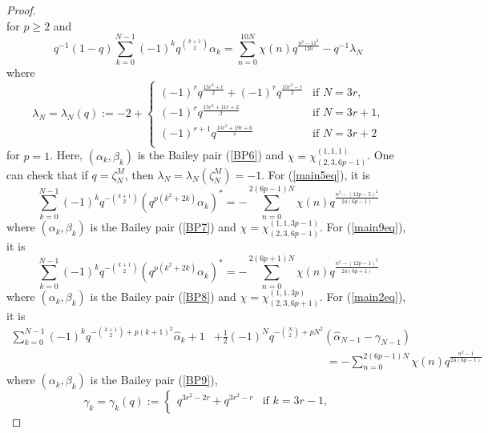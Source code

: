 \documentclass[11pt,reqno]{amsart}
\theoremstyle{definition}
\numberwithin{equation}{section}
\renewcommand{\=}{\;=\;}
\begin{document}
\begin{proof}
\begin{equation}
\end{equation}
for $p \geq 2$ and
\begin{equation} \label{H11}
q^{-1}(1-q) \sum_{k=0}^{N-1} (-1)^k q^{\binom{k+1}{2}} \alpha_k = \sum_{n=0}^{10N} \chi(n) q^{\frac{n^2 - 11^2}{120}} - q^{-1} \lambda_N
\end{equation}
where
$$
\lambda_N = \lambda_N(q) := -2 +
\begin{cases}
 (-1)^{r} q^{\frac{15r^2 + r}{2}} +  (-1)^{r} q^{\frac{15r^2 - r}{2}} &\text{if $N=3r$,}\\
 (-1)^{r} q^{\frac{15r^2 + 11r + 2}{2}} &\text{if $N=3r+1$,}\\
(-1)^{r+1} q^{\frac{15r^2 + 19r + 6}{2}}  &\text{if $N=3r+2$}\\
\end{cases}
$$
for $p=1$. Here, $(\alpha_k, \beta_k)$ is the Bailey pair (\ref{BP6}) and $\chi=\chi_{(2,3,6p-1)}^{(1,1,1)}$. One can check that if $q=\zeta_N^{M}$, then $\lambda_N = \lambda_N(\zeta_N^{M}) = -1$. For (\ref{main5eq}), it is
\begin{equation} \label{H5p}
\sum_{k=0}^{N-1} (-1)^k q^{-\binom{k+1}{2}} (q^{p(k^2 + 2k)} \alpha_k)^{*}  = - \sum_{n=0}^{2(6p-1)N} \chi(n) q^{\frac{n^2 - (12p-5)^2}{24(6p-1)}}
\end{equation}
where $(\alpha_k, \beta_k)$ is the Bailey pair (\ref{BP7}) and $\chi=\chi_{(2,3,6p-1)}^{(1,1,3p-1)}$. For (\ref{main9eq}), it is
\begin{equation} \label{main9poly}
\sum_{k=0}^{N-1} (-1)^k q^{-\binom{k+1}{2}} (q^{p(k^2+2k)} \alpha_k)^*
= -\sum_{n=0}^{2(6p+1)N} \chi(n) q^{\frac{n^2 - (12p-1)^2}{24(6p+1)}}
\end{equation}
where $(\alpha_k, \beta_k)$ is the Bailey pair (\ref{BP8}) and $\chi=\chi_{(2,3,6p+1)}^{(1,1,3p)}$. For (\ref{main2eq}), it is
\begin{equation} \label{main2poly}
\begin{aligned}
\sum_{k=0}^{N-1} (-1)^{k} q^{-\binom{k+1}{2} + p(k+1)^2} \widehat{\alpha}_k
 + 1
 & + \frac{1}{2} (-1)^N q^{-\binom{N}{2}+ pN^2 }
 (\widehat{\alpha}_{N-1}-\gamma_{N-1}) \\
 & \qquad \qquad \qquad \qquad \qquad = -\sum_{n=0}^{2(6p-1)N}\chi(n) q^{\frac{n^2-1}{24(6p-1)}}
\end{aligned}
\end{equation}
where $(\alpha_k, \beta_k)$ is the Bailey pair (\ref{BP9}), 
$$
\gamma_k = \gamma_k(q) :=
\begin{cases}
       q^{3r^2-2r}+q^{3r^2-r}   &\text{if $k=3r-1$},\\

\end{cases}$$
\end{proof}
\end{document}
